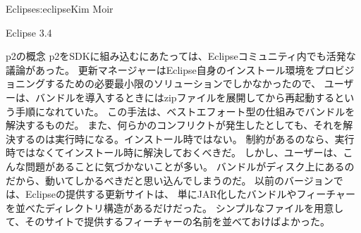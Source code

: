 \begin{aosachapter}{Eclipse}{s:eclipse}{Kim Moir}
\begin{aosasect1}{Eclipse 3.4}
\begin{aosasect2}{p2の概念}
p2をSDKに組み込むにあたっては、Eclipseコミュニティ内でも活発な議論があった。
更新マネージャーはEclipse自身のインストール環境をプロビジョニングするための必要最小限のソリューションでしかなかったので、
ユーザーは、バンドルを導入するときにはzipファイルを展開してから再起動するという手順になれていた。
この手法は、ベストエフォート型の仕組みでバンドルを解決するものだ。
また、何らかのコンフリクトが発生したとしても、それを解決するのは実行時になる。インストール時ではない。
制約があるのなら、実行時ではなくてインストール時に解決しておくべきだ。
しかし、ユーザーは、こんな問題があることに気づかないことが多い。
バンドルがディスク上にあるのだから、動いてしかるべきだと思い込んでしまうのだ。
以前のバージョンでは、Eclipseの提供する更新サイトは、
単にJAR化したバンドルやフィーチャーを並べたディレクトリ構造があるだけだった。
シンプルなファイルを用意して、そのサイトで提供するフィーチャーの名前を並べておけばよかった。

\end{aosasect2}
\end{aosasect1}
\end{aosachapter}
